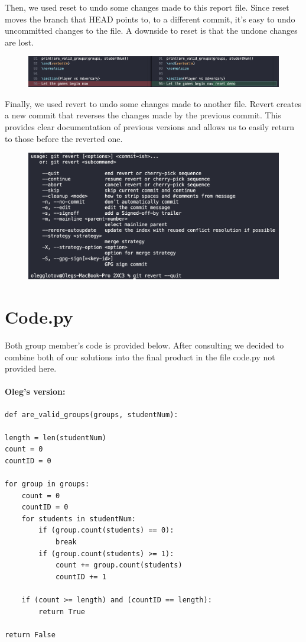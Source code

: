 \documentclass[twocolumn, 10pt]{article}
\begin{document}
Then, we used reset to undo some changes made to this report file. Since reset moves the branch that HEAD points to, to a different commit, it's easy to undo uncommitted changes to the file. A downside to reset is that the undone changes are lost.

\begin{figure}[H]
\includegraphics[width=\linewidth]{reset}
\end{figure}

Finally, we used revert to undo some changes made to another file. Revert creates a new commit that reverses the changes made by the previous commit. This provides clear documentation of previous versions and allows us to easily return to those before the reverted one.

\begin{figure}[H]
\includegraphics[width=\linewidth]{revert}
\end{figure}

\section{Code.py}

Both group member's code is provided below. After consulting we decided to combine both of our solutions into the final product in the file code.py not provided here.

\paragraph{Oleg's version:}

\footnotesize
\begin{verbatim}
def are_valid_groups(groups, studentNum):

length = len(studentNum)
count = 0
countID = 0

for group in groups:
    count = 0
    countID = 0
    for students in studentNum:
        if (group.count(students) == 0):
            break
        if (group.count(students) >= 1):
            count += group.count(students)
            countID += 1
    
    if (count >= length) and (countID == length):
        return True
    
return False
\end{verbatim}
\normalsize
\end{document}
